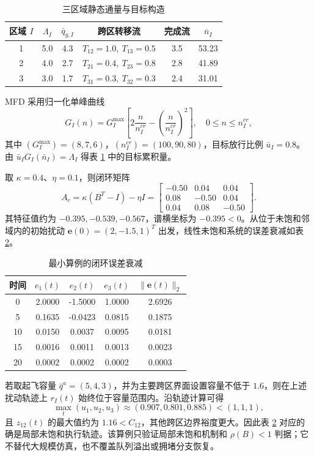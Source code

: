 \documentclass[a4paper,12pt]{article}
\theoremstyle{plain}
\theoremstyle{definition}
\theoremstyle{remark}
\begin{document}
\begin{table}[htbp]
\centering
\caption{三区域静态通量与目标构造}
\label{tab:toy_static}
\begin{tabular}{cccccc}
\toprule
区域 $I$ & $\Lambda_I$ & $\bar q_{g,I}$ & 跨区转移流 & 完成流 & $\bar n_I$\\
\midrule
1 & 5.0 & 4.3 & $T_{12}=1.0,\ T_{13}=0.5$ & 3.5 & 53.23\\
2 & 4.0 & 2.7 & $T_{21}=0.4,\ T_{23}=0.8$ & 2.8 & 41.89\\
3 & 3.0 & 1.7 & $T_{31}=0.3,\ T_{32}=0.3$ & 2.4 & 31.01\\
\bottomrule
\end{tabular}
\end{table}

MFD 采用归一化单峰曲线
\[
    G_I(n)=G_I^{\max}\left[2\frac{n}{n_I^{cr}}-\left(\frac{n}{n_I^{cr}}\right)^2\right],
    \quad 0\le n\le n_I^{cr},
\]
其中 $(G_I^{\max})=(8,7,6)$，$(n_I^{cr})=(100,90,80)$，目标放行比例 $\bar u_I=0.8$。由 $\bar u_I G_I(\bar n_I)=\Lambda_I$ 得表 \ref{tab:toy_static} 中的目标累积量。

取 $\kappa=0.4$、$\eta=0.1$，则闭环矩阵
\[
    A_c=\kappa(B^T-I)-\eta I
    =
    \begin{bmatrix}
    -0.50 & 0.04 & 0.04\\
    0.08 & -0.50 & 0.04\\
    0.04 & 0.08 & -0.50
    \end{bmatrix}.
\]
其特征值约为 $-0.395,-0.539,-0.567$，谱横坐标为 $-0.395<0$。从位于未饱和邻域内的初始扰动 $\bm e(0)=(2,-1.5,1)^T$ 出发，线性未饱和系统的误差衰减如表 \ref{tab:toy_decay}。

\begin{table}[htbp]
\centering
\caption{最小算例的闭环误差衰减}
\label{tab:toy_decay}
\begin{tabular}{ccccc}
\toprule
时间 & $e_1(t)$ & $e_2(t)$ & $e_3(t)$ & $\|\bm e(t)\|_2$\\
\midrule
0  & 2.0000 & -1.5000 & 1.0000 & 2.6926\\
5  & 0.1635 & -0.0423 & 0.0815 & 0.1875\\
10 & 0.0150 & 0.0037 & 0.0095 & 0.0181\\
15 & 0.0016 & 0.0011 & 0.0013 & 0.0023\\
20 & 0.0002 & 0.0002 & 0.0002 & 0.0003\\
\bottomrule
\end{tabular}
\end{table}

若取起飞容量 $\bar q^a=(5,4,3)$，并为主要跨区界面设置容量不低于 $1.6$，则在上述扰动轨迹上 $r_I(t)$ 始终位于容量范围内。沿轨迹计算可得
\[
    \max_t(u_1,u_2,u_3)\approx(0.907,0.801,0.885)<(1,1,1),
\]
且 $z_{12}(t)$ 的最大值约为 $1.16<C_{12}$，其他跨区边界裕度更大。因此表 \ref{tab:toy_decay} 对应的确是局部未饱和执行轨迹。该算例只验证局部未饱和机制和 $\rho(B)<1$ 判据；它不替代大规模仿真，也不覆盖队列溢出或拥堵分支恢复。
\end{document}

